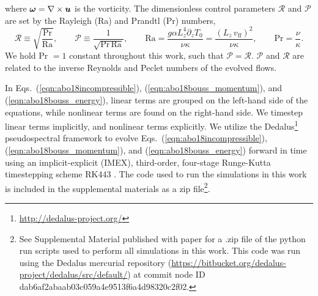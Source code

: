 where $\bm{\omega} = \nabla \times \bm{u}$ is the vorticity.
The dimensionless control parameters $\mathcal{R}$ and $\mathcal{P}$ are set by the Rayleigh (Ra) and Prandtl (Pr) numbers,
\begin{equation}
\mathcal{R} \equiv \sqrt{\frac{\text{Pr}}{\text{Ra}}}, \qquad \mathcal{P} \equiv \frac{1}{\sqrt{\text{Pr}\,\text{Ra}}}, \qquad
\text{Ra} = \frac{g \alpha L_z^4 \partial_z T_0}{\nu\kappa} = \frac{(L_z\,v_{\text{ff}})^2}{\nu\kappa}, \qquad \text{Pr} = \frac{\nu}{\kappa}.
\end{equation}
We hold Pr $= 1$ constant throughout this work, such that $\mathcal{P} = \mathcal{R}$.
$\mathcal{P}$ and $\mathcal{R}$ are related to the inverse Reynolds and Peclet numbers of the evolved flows.

In Eqs.~(\ref{eqn:abo18incompressible}), (\ref{eqn:abo18bouss_momentum}), and (\ref{eqn:abo18bouss_energy}), linear terms are grouped on the left-hand side of the equations, while nonlinear terms are found on the right-hand side. We timestep linear terms implicitly, and nonlinear terms explicitly.
We utilize the Dedalus\footnote{\url{http://dedalus-project.org/}} pseudospectral framework \citep{burns&all2016} to evolve Eqs.~(\ref{eqn:abo18incompressible}), (\ref{eqn:abo18bouss_momentum}), and (\ref{eqn:abo18bouss_energy}) forward in time using an implicit-explicit (IMEX), third-order, four-stage Runge-Kutta timestepping scheme RK443 \citep{ascher&all1997}. 
The code used to run the simulations in this work is included in the supplemental materials as a zip file\footnote{See Supplemental Material published with paper for a .zip file of the python run scripts used to perform all simulations in this work. This code was run using the Dedalus mercurial repository (\url{https://bitbucket.org/dedalus-project/dedalus/src/default/}) at commit node ID dab6af2abaab03c059a4e9513f6a4d98320c2f02.}.

